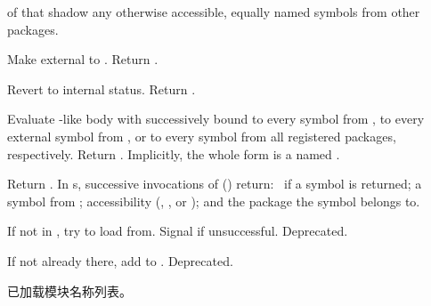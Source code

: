 \begin{LIST}{1cm}
  {
     of  that shadow any
    otherwise accessible, equally named symbols from other packages.
  }

  {
    Make  external to . Return \retval{\T}.
  }

  {
    Revert  to internal status. Return \retval{\T}.
  }
  
  {
    Evaluate -like body with  successively bound to every
    symbol from , to every external symbol from
    , or to every symbol from all registered packages, 
    respectively. Return .  Implicitly,
    the whole form is a  named \NIL. 
  }

  {
    Return . In s, successive
    invocations of  () return: \T\ if a symbol is returned;
    a symbol from ; accessibility
    (, , or ); and the
    package the symbol belongs to.
  }

  {
    If not in , try  to load
     from. Signal  if
    unsuccessful. Deprecated. 
  }

  {
    If not already there, add  to
    . Deprecated. 
  }

  {
    已加载模块名称列表。
  }

\end{LIST}


